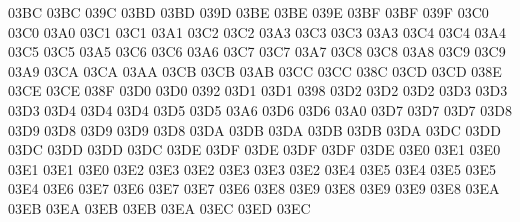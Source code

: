 \setcclcuc 03BC 03BC 039C %
\setcclcuc 03BD 03BD 039D %
\setcclcuc 03BE 03BE 039E %
\setcclcuc 03BF 03BF 039F %
\setcclcuc 03C0 03C0 03A0 %
\setcclcuc 03C1 03C1 03A1 %
\setcclcuc 03C2 03C2 03A3 %
\setcclcuc 03C3 03C3 03A3 %
\setcclcuc 03C4 03C4 03A4 %
\setcclcuc 03C5 03C5 03A5 %
\setcclcuc 03C6 03C6 03A6 %
\setcclcuc 03C7 03C7 03A7 %
\setcclcuc 03C8 03C8 03A8 %
\setcclcuc 03C9 03C9 03A9 %
\setcclcuc 03CA 03CA 03AA %
\setcclcuc 03CB 03CB 03AB %
\setcclcuc 03CC 03CC 038C %
\setcclcuc 03CD 03CD 038E %
\setcclcuc 03CE 03CE 038F %
\setcclcuc 03D0 03D0 0392 %
\setcclcuc 03D1 03D1 0398 %
\setcclcuc 03D2 03D2 03D2 %
\setcclcuc 03D3 03D3 03D3 %
\setcclcuc 03D4 03D4 03D4 %
\setcclcuc 03D5 03D5 03A6 %
\setcclcuc 03D6 03D6 03A0 %
\setcclcuc 03D7 03D7 03D7 %
\setcclcuc 03D8 03D9 03D8 %
\setcclcuc 03D9 03D9 03D8 %
\setcclcuc 03DA 03DB 03DA %
\setcclcuc 03DB 03DB 03DA %
\setcclcuc 03DC 03DD 03DC %
\setcclcuc 03DD 03DD 03DC %
\setcclcuc 03DE 03DF 03DE %
\setcclcuc 03DF 03DF 03DE %
\setcclcuc 03E0 03E1 03E0 %
\setcclcuc 03E1 03E1 03E0 %
\setcclcuc 03E2 03E3 03E2 %
\setcclcuc 03E3 03E3 03E2 %
\setcclcuc 03E4 03E5 03E4 %
\setcclcuc 03E5 03E5 03E4 %
\setcclcuc 03E6 03E7 03E6 %
\setcclcuc 03E7 03E7 03E6 %
\setcclcuc 03E8 03E9 03E8 %
\setcclcuc 03E9 03E9 03E8 %
\setcclcuc 03EA 03EB 03EA %
\setcclcuc 03EB 03EB 03EA %
\setcclcuc 03EC 03ED 03EC %
